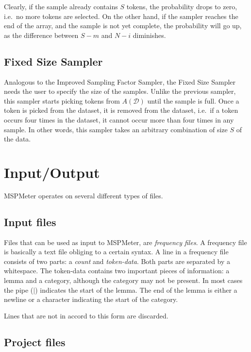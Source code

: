 \documentclass{article}
\begin{document}
Clearly, if the sample already contains $S$ tokens, the probability drops to zero, i.e.\ no more tokens are selected. On the other hand, if the sampler reaches the end of the array, and the sample is not yet complete, the probability will go up, as the difference between $S-m$ and $N-i$ diminishes.


\subsection{Fixed Size Sampler}

Analogous to the Improved Sampling Factor Sampler, the Fixed Size Sampler needs the user to specify the size of the samples. Unlike the previous sampler, this sampler starts picking tokens from $A(\mathcal{D})$ until the sample is full. Once a token is picked from the dataset, it is removed from the dataset, i.e.\ if a token occurs four times in the dataset, it cannot occur more than four times in any sample. In other words, this sampler takes an arbitrary combination of size $S$ of the data. 






\section{Input/Output}

MSPMeter operates on several different types of files. 



\subsection{Input files}

Files that can be used as input to MSPMeter, are \emph{frequency files}. A frequency file is basically a text file obliging to a certain syntax. A line in a frequency file consists of two parts: a \emph{count} and \emph{token-data}. Both parts are separated by a whitespace. The token-data contains two important pieces of information: a lemma and a category, although the category may not be present. In most cases the pipe ($|$) indicates the start of the lemma. The end of the lemma is either a newline or a character indicating the start of the category. 

Lines that are not in accord to this form are discarded.


\subsection{Project files}
\end{document}
